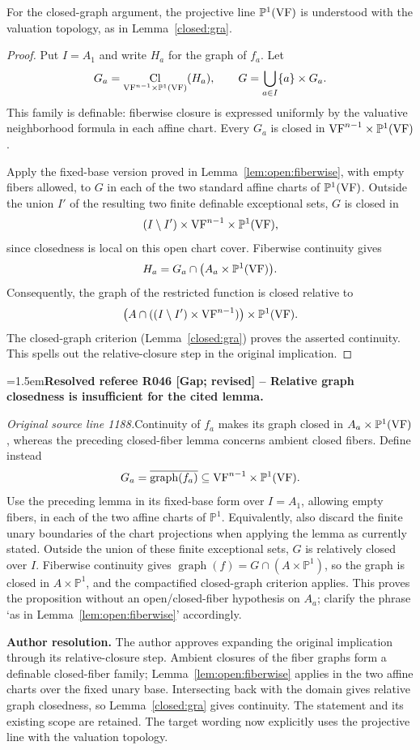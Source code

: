 \documentclass[12pt]{amsart}
\newcommand{\ResolvedRefereeRemark}[5]{%
  \par\medskip\begingroup\normalfont\small\color{gray}%
  \emergencystretch=1.5em\noindent\textbf{Resolved referee R#1 [#2] -- #3.}\par\nobreak\noindent #4\par
  \medskip\color{ResolutionGreen}\noindent\textbf{Author resolution.} #5\par
  \endgroup\medskip
}
\theoremstyle{plain}
\theoremstyle{definition}
\theoremstyle{remark}
\numberwithin{equation}{section}
\theoremstyle{plain}
\newcommand{\VF}{\textup{VF}}
\newcommand{\0}{\emptyset}
\DeclareMathOperator{\Cl}{Cl}
\begin{document}
For the closed-graph argument, the projective line $\mathbb P^1(\VF)$ is understood with the valuation topology, as in Lemma~\ref{closed:gra}.

\begin{proof}
Put $I=A_1$ and write $H_a$ for the graph of $f_a$. Let
\[
G_a=\Cl_{\VF^{n-1}\times\mathbb P^1(\VF)}(H_a),\qquad
G=\bigcup_{a\in I}\{a\}\times G_a.
\]
This family is definable: fiberwise closure is expressed uniformly by the valuative neighborhood formula in each affine chart. Every $G_a$ is closed in $\VF^{n-1}\times\mathbb P^1(\VF)$.

Apply the fixed-base version proved in Lemma~\ref{lem:open:fiberwise}, with empty fibers allowed, to $G$ in each of the two standard affine charts of $\mathbb P^1(\VF)$. Outside the union $I'$ of the resulting two finite definable exceptional sets, $G$ is closed in
\[
(I\setminus I')\times\VF^{n-1}\times\mathbb P^1(\VF),
\]
since closedness is local on this open chart cover. Fiberwise continuity gives
\[
H_a=G_a\cap\bigl(A_a\times\mathbb P^1(\VF)\bigr).
\]
Consequently, the graph of the restricted function is closed relative to
\[
\bigl(A\cap((I\setminus I')\times\VF^{n-1})\bigr)\times\mathbb P^1(\VF).
\]
The closed-graph criterion (Lemma~\ref{closed:gra}) proves the asserted continuity. This spells out the relative-closure step in the original implication.
\end{proof}

\ResolvedRefereeRemark{046}{Gap; revised}{Relative graph closedness is insufficient for the cited lemma}{%
\textit{Original source line 1188.}\quad Continuity of $f_a$ makes its graph closed in $A_a\times\mathbb P^1(\VF)$, whereas the preceding closed-fiber lemma concerns ambient closed fibers. Define instead
\[
 G_a=\overline{\operatorname{graph}(f_a)}\subseteq\VF^{n-1}\times\mathbb P^1(\VF).
\]
Use the preceding lemma in its fixed-base form over $I=A_1$, allowing empty fibers, in each of the two affine charts of $\mathbb P^1$. Equivalently, also discard the finite unary boundaries of the chart projections when applying the lemma as currently stated. Outside the union of these finite exceptional sets, $G$ is relatively closed over $I$. Fiberwise continuity gives $\operatorname{graph}(f)=G\cap(A\times\mathbb P^1)$, so the graph is closed in $A\times\mathbb P^1$, and the compactified closed-graph criterion applies. This proves the proposition without an open/closed-fiber hypothesis on $A_a$; clarify the phrase `as in Lemma~\ref{lem:open:fiberwise}' accordingly.
}{The author approves expanding the original implication through its relative-closure step. Ambient closures of the fiber graphs form a definable closed-fiber family; Lemma~\ref{lem:open:fiberwise} applies in the two affine charts over the fixed unary base. Intersecting back with the domain gives relative graph closedness, so Lemma~\ref{closed:gra} gives continuity. The statement and its existing scope are retained. The target wording now explicitly uses the projective line with the valuation topology.}
\end{document}
